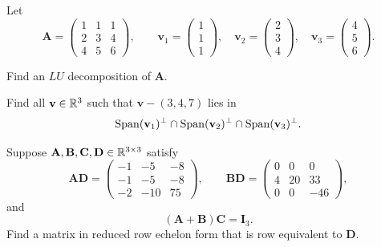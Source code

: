 \begin{problem}
Let
\[
\mathbf A=
\begin{pmatrix}
1&1&1\\
2&3&4\\
4&5&6
\end{pmatrix},
\qquad
\mathbf v_1=\begin{pmatrix}1\\1\\1\end{pmatrix},\quad
\mathbf v_2=\begin{pmatrix}2\\3\\4\end{pmatrix},\quad
\mathbf v_3=\begin{pmatrix}4\\5\\6\end{pmatrix}.
\]
\begin{problemsubparts}
\item Find an $LU$ decomposition of $\mathbf A$.
\item Find all $\mathbf v\in\mathbb{R}^3$ such that $\mathbf v-(3,4,7)$ lies in
\[
\operatorname{Span}(\mathbf v_1)^\perp\cap\operatorname{Span}(\mathbf v_2)^\perp\cap\operatorname{Span}(\mathbf v_3)^\perp.
\]
\end{problemsubparts}
\end{problem}

\begin{problem}
Suppose $\mathbf A,\mathbf B,\mathbf C,\mathbf D\in\mathbb{R}^{3\times3}$ satisfy
\[
\mathbf A\mathbf D=
\begin{pmatrix}
-1&-5&-8\\
-1&-5&-8\\
-2&-10&75
\end{pmatrix},
\qquad
\mathbf B\mathbf D=
\begin{pmatrix}
0&0&0\\
4&20&33\\
0&0&-46
\end{pmatrix},
\]
and
\[
(\mathbf A+\mathbf B)\mathbf C=\mathbf I_3.
\]
Find a matrix in reduced row echelon form that is row equivalent to $\mathbf D$.
\end{problem}

